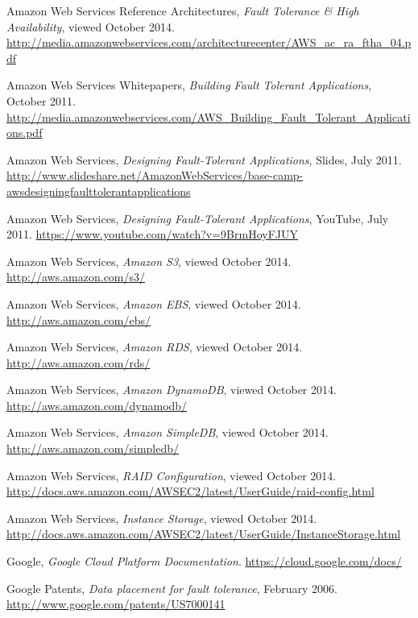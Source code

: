 \documentclass[11pt]{report}
\begin{document}
\begin{thebibliography}{99}

	Amazon Web Services Reference Architectures, \emph{Fault Tolerance \& High Availability}, viewed October 2014.
	\url{http://media.amazonwebservices.com/architecturecenter/AWS_ac_ra_ftha_04.pdf}
	
	Amazon Web Services Whitepapers, \emph{Building Fault Tolerant Applications}, October 2011.
	\url{http://media.amazonwebservices.com/AWS_Building_Fault_Tolerant_Applications.pdf}
	
	Amazon Web Services, \emph{Designing Fault-Tolerant Applications}, Slides, July 2011.
	\url{http://www.slideshare.net/AmazonWebServices/base-camp-awsdesigningfaulttolerantapplications}
	
	Amazon Web Services, \emph{Designing Fault-Tolerant Applications}, YouTube, July 2011.
	\url{https://www.youtube.com/watch?v=9BrmHoyFJUY}

	Amazon Web Services, \emph{Amazon S3}, viewed October 2014.
	\url{http://aws.amazon.com/s3/}
	
	Amazon Web Services, \emph{Amazon EBS}, viewed October 2014.
	\url{http://aws.amazon.com/ebs/}
	
	Amazon Web Services, \emph{Amazon RDS}, viewed October 2014.
	\url{http://aws.amazon.com/rds/}
	
	Amazon Web Services, \emph{Amazon DynamoDB}, viewed October 2014.
	\url{http://aws.amazon.com/dynamodb/}
	
	Amazon Web Services, \emph{Amazon SimpleDB}, viewed October 2014.
	\url{http://aws.amazon.com/simpledb/}	

	Amazon Web Services, \emph{RAID Configuration}, viewed October 2014.
	\url{http://docs.aws.amazon.com/AWSEC2/latest/UserGuide/raid-config.html}
	
	Amazon Web Services, \emph{Instance Storage}, viewed October 2014.
	\url{http://docs.aws.amazon.com/AWSEC2/latest/UserGuide/InstanceStorage.html}

	Google, \emph{Google Cloud Platform Documentation}.
	\url{https://cloud.google.com/docs/}	
	
	Google Patents, \emph{Data placement for fault tolerance}, February 2006.
	\url{http://www.google.com/patents/US7000141}
	

\end{thebibliography}
\end{document}
